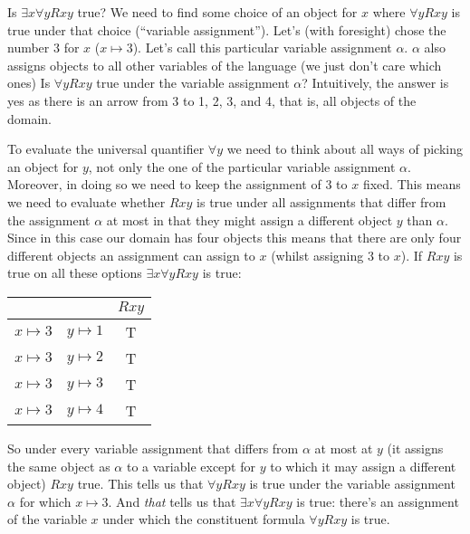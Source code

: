  Is $\exists x\forall y Rxy$ true? We need to find some choice of an object for $x$ where $\forall y Rxy$ is true under that choice (``variable assignment''). Let's (with foresight) chose the number 3 for $x$ ($x\mapsto 3$). Let's call this particular variable assignment $\alpha$. $\alpha$ also assigns objects to all other variables of the language (we just don't care which ones) Is $\forall y Rxy$ true under the variable assignment $\alpha$? Intuitively, the answer is yes as there is an arrow from 3 to 1, 2, 3, and 4, that is, all objects of the domain.
 
 To evaluate the universal quantifier $\forall y$ we need to think about all ways of picking an object for $y$, not only the one of the particular variable assignment $\alpha$. Moreover, in doing so we need to keep the assignment of $3$ to $x$ fixed. This means we need to evaluate whether $Rxy$ is true under all assignments that differ from the assignment $\alpha$ at most in that they might assign a different object $y$ than $\alpha$. Since in this case our domain has four objects this means that there are only four different objects an assignment can assign to $x$ (whilst assigning $3$ to $x$). If $Rxy$ is true on all these options $\exists x\forall y Rxy$ is true:
\begin{center}
 \begin{tabular}{cc|c}
&&$Rxy$\Bstrut\\\hline\Tstrut
$x\mapsto 3$&$y\mapsto 1$&T\\
$x\mapsto 3$&$y\mapsto 2$&T\\
$x\mapsto 3$&$y\mapsto 3$&T\\
$x\mapsto 3$&$y\mapsto 4$&T\\
 \end{tabular}
\end{center}So under every variable assignment that differs from $\alpha$ at most at $y$ (it assigns the same object as $\alpha$ to a variable except for $y$ to which it may assign a different object)  $Rxy$ true. This tells us that $\forall y Rxy$ is true under the variable assignment $\alpha$ for which $x\mapsto 3$. And \emph{that} tells us that $\exists x\forall y Rxy$ is true: there's an assignment of the variable $x$ under which the constituent formula $\forall y Rxy$ is true.

